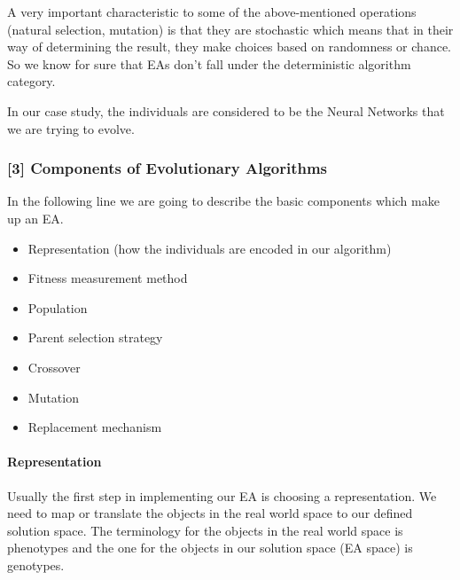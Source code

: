\documentclass[11pt]{article}
\providecommand{\tightlist}{%
      \setlength{\itemsep}{0pt}\setlength{\parskip}{0pt}}
\begin{document}
    A very important characteristic to some of the above-mentioned
operations (natural selection, mutation) is that they are stochastic
which means that in their way of determining the result, they make
choices based on randomness or chance. So we know for sure that EAs
don't fall under the deterministic algorithm category.

In our case study, the individuals are considered to be the Neural
Networks that we are trying to evolve.

    \hypertarget{components-of-evolutionary-algorithms}{%
\subsubsection{{[}3{]} Components of Evolutionary
Algorithms}\label{components-of-evolutionary-algorithms}}

In the following line we are going to describe the basic components
which make up an EA.

\begin{itemize}
\tightlist
\item
  Representation (how the individuals are encoded in our algorithm)
\item
  Fitness measurement method
\item
  Population
\item
  Parent selection strategy
\item
  Crossover
\item
  Mutation
\item
  Replacement mechanism
\end{itemize}

\hypertarget{representation}{%
\paragraph{Representation}\label{representation}}

Usually the first step in implementing our EA is choosing a
representation. We need to map or translate the objects in the real
world space to our defined solution space. The terminology for the
objects in the real world space is phenotypes and the one for the
objects in our solution space (EA space) is genotypes.
\end{document}
